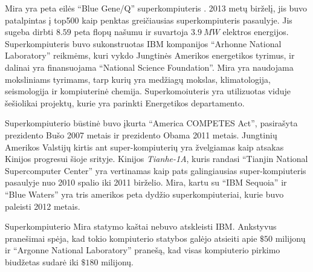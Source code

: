 Mira yra peta eilės ``Blue Gene/Q'' superkompiuteris \cite{wiki:IBM_Mira}.
2013 metų birželį, jis buvo patalpintas į top500 kaip penktas greičiausias superkompiuteris pasaulyje.
Jis sugeba dirbti $8.59$ peta flopų našumu ir suvartoja $3.9~MW$ elektros energijos.
Superkompiuteris buvo sukonstruotas IBM kompanijos ``Arhonne National Laboratory'' reikmėms, kuri vykdo Jungtinės Amerikos energetikos tyrimus, ir dalinai yra finansuojama ``National Science Foundation''.
Mira yra naudojama moksliniams tyrimams, tarp kurių yra medžiagų mokslas, klimatologija, seismologija ir kompiuterinė chemija.
Superkomoiuteris yra utilizuotas viduje šešiolikai projektų, kurie yra parinkti Energetikos departamento.

Superkompiuterio būstinė buvo įkurta ``America COMPETES Act'', pasirašyta prezidento Bušo 2007 metais ir prezidento Obama 2011 metais.
Jungtinių Amerikos Valstijų kirtis ant super-kompiuterių yra žvelgiamas kaip atsakas Kinijos progresui šioje srityje.
Kinijos \textit{Tianhe-1A}, kuris randasi ``Tianjin National Supercomputer Center'' yra vertinamas kaip pats galingiausias super-kompiuteris pasaulyje nuo 2010 spalio iki 2011 birželio.
Mira, kartu su ``IBM Sequoia'' ir ``Blue Waters'' yra tris amerikos peta dydžio superkompiuteriai, kurie buvo paleisti 2012 metais.

Superkompiuterio Mira statymo kaštai nebuvo atskleisti IBM.
Ankstyvus pranešimai spėja, kad tokio kompiuterio statybos galėjo atsieiti apie $\$50$ milijonų ir ``Argonne National Laboratory'' pranešą, kad visas kompiuterio pirkimo biudžetas sudarė iki  $\$180$ milijonų.